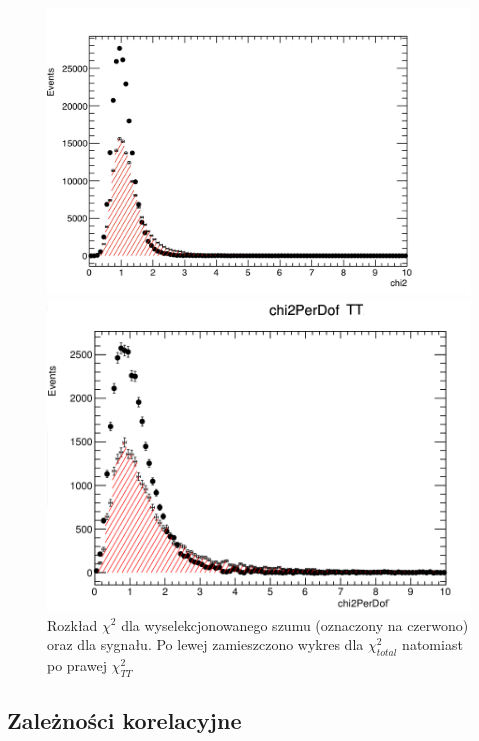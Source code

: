 \begin{figure}[H]    
\begin{minipage}[t]{0.5\textwidth}
\includegraphics[width=\linewidth]{rozdzial6/jpsi_chi2_sPlot.png}
\end{minipage}
\hspace{\fill}
\begin{minipage}[t]{0.5\textwidth}
\includegraphics[width=\linewidth]{rozdzial6/jpsi_chi2TT_sPlot.png}
\end{minipage}
\caption{Rozkład $\chi^2$ dla wyselekcjonowanego szumu (oznaczony na czerwono) oraz dla sygnału. Po lewej zamieszczono wykres dla $\chi^2_{total}$ natomiast po prawej $\chi_{TT}^2$} \label{chi2sPlot}
\end{figure} 

\subsection{Zależności korelacyjne}